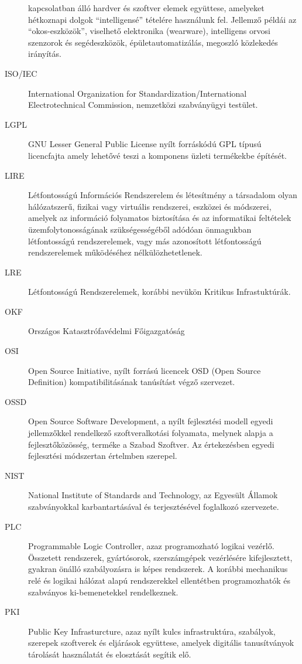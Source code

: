 \documentclass[12pt,magyar,a4paper,oneside]{scrreprt}
\begin{document}
\begin{description}
kapcsolatban álló hardver és szoftver elemek együttese, amelyeket
hétkoznapi dolgok ``intelligensé'' tételére használunk fel. Jellemző
példái az ``okos-eszközök'', viselhető elektronika (wearware),
intelligens orvosi szenzorok és segédeszközök, épületautomatizálás,
megoszló közlekedés irányítás.
\item[ISO/IEC]
International Organization for Standardization/International
Electrotechnical Commission, nemzetközi szabványügyi testület.
\item[LGPL]
GNU Lesser General Public License nyílt forráskódú GPL típusú
licencfajta amely lehetővé teszi a komponens üzleti termékekbe építését.
\item[LIRE]
Létfontosságú Információs Rendszerelem és létesítmény a társadalom olyan
hálózatszerű, fizikai vagy virtuális rendszerei, eszközei és módszerei,
amelyek az információ folyamatos biztosítása és az informatikai
feltételek üzemfolytonosságának szükségességéből adódóan önmagukban
létfontosságú rendszerelemek, vagy más azonosított létfontosságú
rendszerelemek működéséhez nélkülözhetetlenek.
\item[LRE]
Létfontosságú Rendszerelemek, korábbi nevükön Kritikus Infrastuktúrák.
\item[OKF]
Országos Katasztrófavédelmi Főigazgatóság
\item[OSI]
Open Source Initiative, nyílt forrású licencek OSD (Open Source
Definition) kompatibilitásának tanúsítást végző szervezet.
\item[OSSD]
Open Source Software Development, a nyílt fejlesztési modell egyedi
jellemzőkkel rendelkező szoftveralkotási folyamata, melynek alapja a
fejlesztőközösség, terméke a Szabad Szoftver. Az értekezésben egyedi
fejlesztési módszertan értelmben szerepel.
\item[NIST]
National Institute of Standards and Technology, az Egyesült Államok
szabványokkal karbantartásával és terjesztésével foglalkozó szervezete.
\item[PLC]
Programmable Logic Controller, azaz programozható logikai vezérlő.
Összetett rendszerek, gyártósorok, szerszámgépek vezérlésére
kifejlesztett, gyakran önálló szabályozásra is képes rendszerek. A
korábbi mechanikus relé és logikai hálózat alapú rendszerekkel
ellentétben programozhatók és szabványos ki-bemenetekkel rendelkeznek.
\item[PKI]
Public Key Infrasturcture, azaz nyílt kulcs infrastruktúra, szabályok,
szerepek szoftverek és eljárások együttese, amelyek digitális
tanusítványok tárolását használatát és elosztását segítik elő.

\end{description}
\end{document}
